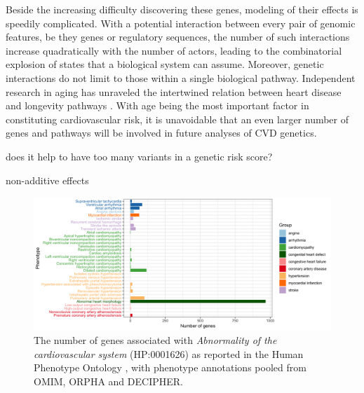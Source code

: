 \documentclass[letter]{bioinfo}
\newcommand{\comment}[1]{\textcolor{red}{#1}}
\begin{document}
Beside the increasing difficulty discovering these genes, modeling of their effects is speedily complicated. With a potential interaction between every pair of genomic features, be they genes or regulatory sequences, the number of such interactions increase quadratically with the number of actors, leading to the combinatorial explosion of states that a biological system can assume.
Moreover, genetic interactions do not limit to those within a single biological pathway. Independent research in aging has unraveled the intertwined relation between heart disease and longevity pathways \citep{North:2012:Intersection}.  With age being the most important factor in constituting cardiovascular risk, it is unavoidable that an even larger number of genes and pathways will be involved in future analyses of CVD genetics.


does it help to have too many variants in a genetic risk score?

non-additive effects






\begin{figure}[!tpb]
	\includegraphics[width=1.\linewidth]{hpo-gene-count}
	\caption{The number of genes associated with \textit{Abnormality of the cardiovascular system} (HP:0001626) as reported in the Human Phenotype Ontology \citep{Kohler:2014:Human}, with phenotype annotations pooled from OMIM, ORPHA and DECIPHER.}
	\label{fig:hpo_gene_count}	
\end{figure}
\end{document}
